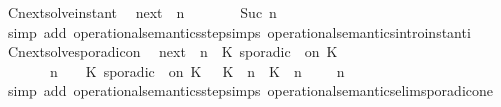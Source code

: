 \begin{isabellebody}
\isanewline
{}\isamarkupfalse%
\ Cnext{\isacharunderscore}solve{\isacharunderscore}instant{\isacharcolon}\isanewline
\ \ {\isacartoucheopen}{\isacharparenleft}{\isasymC}\isactrlsub n\isactrlsub e\isactrlsub x\isactrlsub t\ {\isacharparenleft}{\isasymGamma}{\isacharcomma}\ n\ {\isasymturnstile}\ {\isacharbrackleft}{\isacharbrackright}\ {\isasymtriangleright}\ {\isasymPhi}{\isacharparenright}{\isacharparenright}\ {\isasymsupseteq}\ {\isacharbraceleft}\ {\isasymGamma}{\isacharcomma}\ Suc\ n\ {\isasymturnstile}\ {\isasymPhi}\ {\isasymtriangleright}\ {\isacharbrackleft}{\isacharbrackright}\ {\isacharbraceright}{\isacartoucheclose}\isanewline
%
\isadelimproof
%
\endisadelimproof
%
\isatagproof
{}\isamarkupfalse%
\ {\isacharparenleft}simp\ add{\isacharcolon}\ operational{\isacharunderscore}semantics{\isacharunderscore}step{\isachardot}simps\ operational{\isacharunderscore}semantics{\isacharunderscore}intro{\isachardot}instant{\isacharunderscore}i{\isacharparenright}%
\endisatagproof
{\isafoldproof}%
%
\isadelimproof
\isanewline
%
\endisadelimproof
\isanewline
{}\isamarkupfalse%
\ Cnext{\isacharunderscore}solve{\isacharunderscore}sporadicon{\isacharcolon}\isanewline
\ \ {\isacartoucheopen}{\isacharparenleft}{\isasymC}\isactrlsub n\isactrlsub e\isactrlsub x\isactrlsub t\ {\isacharparenleft}{\isasymGamma}{\isacharcomma}\ n\ {\isasymturnstile}\ {\isacharparenleft}{\isacharparenleft}K\ sporadic\ {\isasymtau}\ on\ K\ {\isacharhash}\ {\isasymPsi}{\isacharparenright}\ {\isasymtriangleright}\ {\isasymPhi}{\isacharparenright}{\isacharparenright}\isanewline
\ \ \ \ {\isasymsupseteq}\ {\isacharbraceleft}\ {\isasymGamma}{\isacharcomma}\ n\ {\isasymturnstile}\ {\isasymPsi}\ {\isasymtriangleright}\ {\isacharparenleft}{\isacharparenleft}K\ sporadic\ {\isasymtau}\ on\ K\ {\isacharhash}\ {\isasymPhi}{\isacharparenright}{\isacharcomma}\ {\isacharparenleft}{\isacharparenleft}K\ {\isasymUp}\ n{\isacharparenright}\ {\isacharhash}\ {\isacharparenleft}K\ {\isasymDown}\ n\ {\isacharat}\ {\isasymtau}{\isacharparenright}\ {\isacharhash}\ {\isasymGamma}{\isacharparenright}{\isacharcomma}\ n\ {\isasymturnstile}\ {\isasymPsi}\ {\isasymtriangleright}\ {\isasymPhi}\ {\isacharbraceright}{\isacartoucheclose}\isanewline
%
\isadelimproof
%
\endisadelimproof
%
\isatagproof
{}\isamarkupfalse%
\ {\isacharparenleft}simp\ add{\isacharcolon}\ operational{\isacharunderscore}semantics{\isacharunderscore}step{\isachardot}simps\ operational{\isacharunderscore}semantics{\isacharunderscore}elim{\isachardot}sporadic{\isacharunderscore}on{\isacharunderscore}e{}\isanewline

\end{isabellebody}
